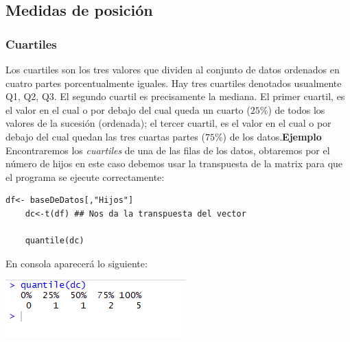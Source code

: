 \documentclass[12pt,hidelinks]{article}
\begin{document}
	\subsection{Medidas de posición}
	\subsubsection{Cuartiles}
	Los cuartiles son los tres valores que dividen al conjunto de datos ordenados en cuatro partes porcentualmente iguales. Hay tres cuartiles denotados usualmente Q1, Q2, Q3. El segundo cuartil es precisamente la mediana. El primer cuartil, es el valor en el cual o por debajo del cual queda un cuarto ($25\%$) de todos los valores de la sucesión (ordenada); el tercer cuartil, es el valor en el cual o por debajo del cual quedan las tres cuartas partes ($75\%$) de los datos.\textbf{Ejemplo} Encontraremos los \textit{cuartiles} de una de las filas de los datos, obtaremos por el número de hijos en este caso debemos usar la transpuesta de la matrix para que el programa se ejecute correctamente:
	\begin{lstlisting}[frame=single]
	df<- baseDeDatos[,"Hijos"]
	dc<-t(df) ## Nos da la transpuesta del vector
	
	quantile(dc)
	\end{lstlisting}
	En consola aparecerá lo siguiente:
	\begin{center}
		\includegraphics[]{images/2/Cuartiles.PNG}
	\end{center}
\end{document}
